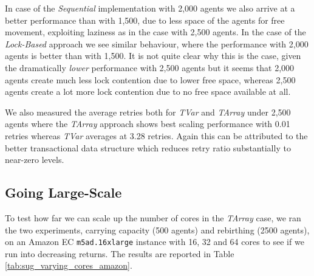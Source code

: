 In case of the \textit{Sequential} implementation with 2,000 agents we also arrive at a better performance than with 1,500, due to less space of the agents for free movement, exploiting laziness as in the case with 2,500 agents. In the case of the \textit{Lock-Based} approach we see similar behaviour, where the performance with 2,000 agents is better than with 1,500. It is not quite clear why this is the case, given the dramatically \textit{lower} performance with 2,500 agents but it seems that 2,000 agents create much less lock contention due to lower free space, whereas 2,500 agents create a lot more lock contention due to no free space available at all.

We also measured the average retries both for \textit{TVar} and \textit{TArray} under 2,500 agents where the \textit{TArray} approach shows best scaling performance with 0.01 retries whereas \textit{TVar} averages at 3.28 retries. Again this can be attributed to the better transactional data structure which reduces retry ratio substantially to near-zero levels.

\subsection{Going Large-Scale}
To test how far we can scale up the number of cores in the \textit{TArray} case, we ran the two experiments, carrying capacity (500 agents) and rebirthing (2500 agents), on an Amazon EC \texttt{m5ad.16xlarge} instance with 16, 32 and 64 cores to see if we run into decreasing returns. The results are reported in Table \ref{tab:sug_varying_cores_amazon}.

